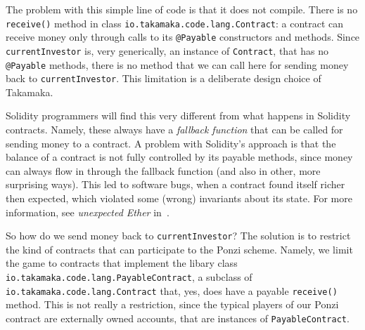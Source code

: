 The problem with this simple line of code is that it does not compile.
There is no \texttt{receive()} method in class
\texttt{io.takamaka.code.lang.Contract}:
a contract can receive money only through calls to its \texttt{@Payable}
constructors and methods. Since \texttt{currentInvestor} is, very generically,
an instance of \texttt{Contract}, that has no \texttt{@Payable} methods,
there is no method
that we can call here for sending money back to \texttt{currentInvestor}.
This limitation is a deliberate design choice of Takamaka.
%
\begin{commentbox}
Solidity programmers will find this very different from what happens
in Solidity contracts. Namely, these always have a \emph{fallback function} that
can be called for sending money to a contract. A problem with Solidity's approach
is that the balance of a contract is not fully controlled by its
payable methods, since money can always flow in through the fallback
function (and also in other, more surprising ways).
This led to software bugs, when a contract found itself
richer then expected, which violated some (wrong) invariants about
its state. For more information, see \emph{unexpected Ether} in~\cite{AntonopoulosWPMP25}.
\end{commentbox}

So how do we send money back to \texttt{currentInvestor}? The solution is to
restrict the kind of contracts that can participate to the Ponzi scheme.
Namely, we limit the game to contracts that implement the libary class
\texttt{io.takamaka.code.lang.PayableContract},
a subclass of \texttt{io.takamaka.code.lang.Contract}
that, yes, does have a payable \texttt{receive()} method.
This is not really a restriction,
since the typical players of our Ponzi contract are externally
owned accounts, that are instances of \texttt{PayableContract}.

